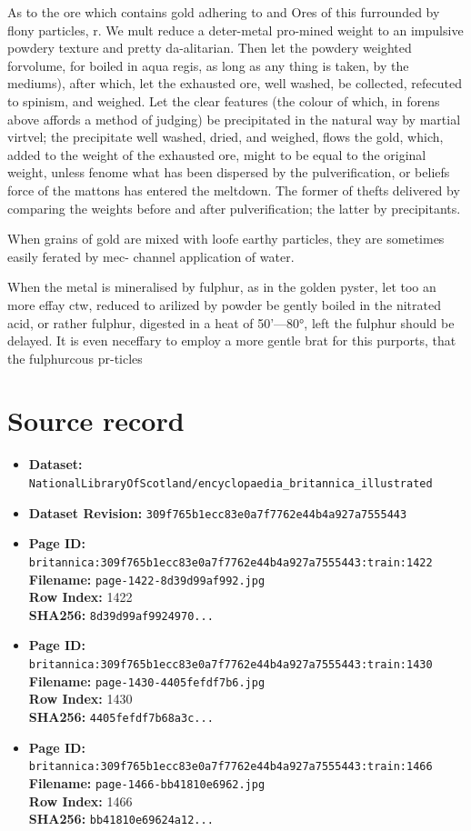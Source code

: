\documentclass{article}
\begin{document}
As to the ore which contains gold adhering to and Ores of this furrounded by flony particles, r. We mult reduce a deter-metal pro-mined weight to an impulsive powdery texture and pretty da-alitarian. Then let the powdery weighted forvolume, for boiled in aqua regis, as long as any thing is taken, by the mediums), after which, let the exhausted ore, well washed, be collected, refecuted to spinism, and weighed. Let the clear features (the colour of which, in forens above affords a method of judging) be precipitated in the natural way by martial virtvel; the precipitate well washed, dried, and weighed, flows the gold, which, added to the weight of the exhausted ore, might to be equal to the original weight, unless fenome what has been dispersed by the pulverification, or beliefs force of the mattons has entered the meltdown. The former of thefts delivered by comparing the weights before and after pulverification; the latter by precipitants.

When grains of gold are mixed with loofe earthy particles, they are sometimes easily ferated by mec- channel application of water.

When the metal is mineralised by fulphur, as in the golden pyster, let too an more effay ctw, reduced to arilized by powder be gently boiled in the nitrated acid, or rather fulphur, digested in a heat of 50’—80°, left the fulphur should be delayed. It is even neceffary to employ a more gentle brat for this purports, that the fulphurcous pr-ticles



\section*{Source record}
\begin{itemize}
\item \textbf{Dataset:} \texttt{NationalLibraryOfScotland/encyclopaedia\_britannica\_illustrated}
\item \textbf{Dataset Revision:} \texttt{309f765b1ecc83e0a7f7762e44b4a927a7555443}
\item \textbf{Page ID:} \texttt{britannica:309f765b1ecc83e0a7f7762e44b4a927a7555443:train:1422} \\
  \textbf{Filename:} \texttt{page-1422-8d39d99af992.jpg} \\
  \textbf{Row Index:} 1422 \\
  \textbf{SHA256:} \texttt{8d39d99af9924970...}
\item \textbf{Page ID:} \texttt{britannica:309f765b1ecc83e0a7f7762e44b4a927a7555443:train:1430} \\
  \textbf{Filename:} \texttt{page-1430-4405fefdf7b6.jpg} \\
  \textbf{Row Index:} 1430 \\
  \textbf{SHA256:} \texttt{4405fefdf7b68a3c...}
\item \textbf{Page ID:} \texttt{britannica:309f765b1ecc83e0a7f7762e44b4a927a7555443:train:1466} \\
  \textbf{Filename:} \texttt{page-1466-bb41810e6962.jpg} \\
  \textbf{Row Index:} 1466 \\
  \textbf{SHA256:} \texttt{bb41810e69624a12...}
\end{itemize}
\end{document}
